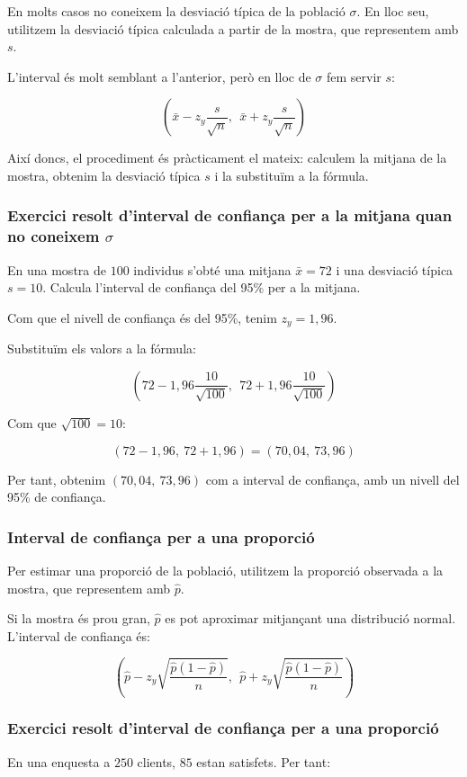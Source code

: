 En molts casos no coneixem la desviació típica de la població $\sigma$. En lloc seu, utilitzem la desviació típica calculada a partir de la mostra, que representem amb $s$.

L'interval és molt semblant a l'anterior, però en lloc de $\sigma$ fem servir $s$:

$$\left(\bar{x}-z_y\frac{s}{\sqrt{n}},\ \ \bar{x}+z_y\frac{s}{\sqrt{n}}\right)$$

Així doncs, el procediment és pràcticament el mateix: calculem la mitjana de la mostra, obtenim la desviació típica $s$ i la substituïm a la fórmula.

\subsubsection{Exercici resolt d'interval de confiança per a la mitjana quan no coneixem $\sigma$}
En una mostra de $100$ individus s'obté una mitjana $\bar{x}=72$ i una desviació típica $s=10$. Calcula l'interval de confiança del 95\% per a la mitjana.

Com que el nivell de confiança és del 95\%, tenim $z_y=1{,}96$.

Substituïm els valors a la fórmula:

$$\left(72-1{,}96\frac{10}{\sqrt{100}},\ \ 72+1{,}96\frac{10}{\sqrt{100}}\right)$$

Com que $\sqrt{100}=10$:

$$(72-1{,}96,\ 72+1{,}96) = (70{,}04,\ 73{,}96)$$

Per tant, obtenim $(70{,}04,\ 73{,}96)$ com a interval de confiança, amb un nivell del 95\% de confiança.

\subsubsection{Interval de confiança per a una proporció}

Per estimar una proporció de la població, utilitzem la proporció observada a la mostra, que representem amb $\hat{p}$.

Si la mostra és prou gran, $\hat{p}$ es pot aproximar mitjançant una distribució normal. L'interval de confiança és:

$$\left(\hat{p}-z_y\sqrt{\frac{\hat{p}(1-\hat{p})}{n}}, \ \ \hat{p}+z_y\sqrt{\frac{\hat{p}(1-\hat{p})}{n}}\right)$$

\subsubsection{Exercici resolt d'interval de confiança per a una proporció}
En una enquesta a $250$ clients, $85$ estan satisfets. Per tant:

